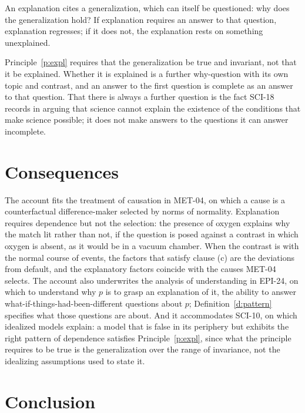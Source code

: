 \documentclass{situationist-preprint}
\begin{document}
\begin{objection}[Regress]
An explanation cites a generalization, which can itself be questioned: why does the generalization hold? If explanation requires an answer to that question, explanation regresses; if it does not, the explanation rests on something unexplained.
\end{objection}

\begin{reply}
Principle~\ref{p:expl} requires that the generalization be true and invariant, not that it be explained. Whether it is explained is a further why-question with its own topic and contrast, and an answer to the first question is complete as an answer to that question. That there is always a further question is the fact SCI-18 records in arguing that science cannot explain the existence of the conditions that make science possible; it does not make answers to the questions it can answer incomplete.
\end{reply}

\section{Consequences}\label{s:consequences}

The account fits the treatment of causation in MET-04, on which a cause is a counterfactual difference-maker selected by norms of normality. Explanation requires dependence but not the selection: the presence of oxygen explains why the match lit rather than not, if the question is posed against a contrast in which oxygen is absent, as it would be in a vacuum chamber. When the contrast is with the normal course of events, the factors that satisfy clause (c) are the deviations from default, and the explanatory factors coincide with the causes MET-04 selects. The account also underwrites the analysis of understanding in EPI-24, on which to understand why $p$ is to grasp an explanation of it, the ability to answer what-if-things-had-been-different questions about $p$; Definition~\ref{d:pattern} specifies what those questions are about. And it accommodates SCI-10, on which idealized models explain: a model that is false in its periphery but exhibits the right pattern of dependence satisfies Principle~\ref{p:expl}, since what the principle requires to be true is the generalization over the range of invariance, not the idealizing assumptions used to state it.

\section{Conclusion}\label{s:conclusion}
\end{document}
